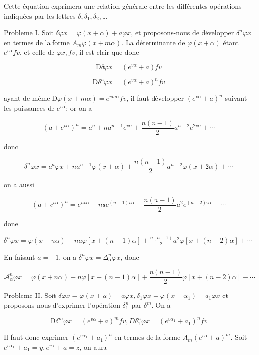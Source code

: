 \documentclass{article}
\begin{document}
Cette équation exprimera une relation générale entre les différentes opérations indiquées par les lettres \(\delta, \delta_{1}, \delta_{2}, \ldots\)

Probleme I. Soit \(\delta \varphi x=\varphi(x+\alpha)+a \varphi x\), et proposons-nous de développer \(\delta^{n} \varphi x\) en termes de la forme \(A_{m} \varphi(x+m \alpha)\). La déterminante de \(\varphi(x+\alpha)\) étant \(e^{v \alpha} f v\), et celle de \(\varphi x, f v\), il est clair que
done

\[
\mathrm{D} \delta \varphi x=\left(e^{v \alpha}+a\right) f v
\]

\[
\mathrm{D} \delta^{n} \varphi x=\left(e^{v \alpha}+a\right)^{n} f v
\]

ayant de même \(\mathrm{D} \varphi(x+m \alpha)=e^{v m \alpha} f v\), il faut développer \(\left(e^{v \alpha}+a\right)^{n}\) suivant les puissances de \(e^{v \alpha}\); or on a

\[
\left(a+e^{v \alpha}\right)^{n}=a^{n}+n a^{n-1} e^{v \alpha}+\frac{n(n-1)}{2} a^{n-2} e^{2 v \alpha}+\cdots
\]

donc

\[
\delta^{n} \varphi x=a^{n} \varphi x+n a^{n-1} \varphi(x+\alpha)+\frac{n(n-1)}{2} a^{n-2} \varphi(x+2 \alpha)+\cdots
\]

on a aussi

\[
\left(a+e^{v \alpha}\right)^{n}=e^{n v \alpha}+n a e^{(n-1) v \alpha}+\frac{n(n-1)}{2} a^{2} e^{(n-2) v \alpha}+\cdots
\]

done

\(\delta^{n} \varphi x=\varphi(x+n \alpha)+n a \varphi[x+(n-1) \alpha]+\frac{n(n-1)}{2} a^{2} \varphi[x+(n-2) \alpha]+\cdots\)

En faisant \(a=-1\), on a \(\delta^{n} \varphi x=\Delta_{\alpha}^{n} \varphi x\), donc

\[
\mathcal{A}_{\alpha}^{n} \varphi x=\varphi(x+n \alpha)-n \varphi[x+(n-1) \alpha]+\frac{n(n-1)}{2} \varphi[x+(n-2) \alpha]-\cdots
\]

Probleme II. Soit \(\delta \varphi x=\varphi(x+\alpha)+a \varphi x, \delta_{1} \varphi x=\varphi\left(x+\alpha_{1}\right)+a_{1} \varphi x\) et proposons-nous d'exprimer l'opération \(\delta_{1}^{n}\) par \(\delta^{m}\). On a

\[
\mathrm{D} \delta^{m} \varphi x=\left(e^{v \alpha}+a\right)^{m} f v, D \delta_{1}^{n} \varphi x=\left(e^{v \alpha_{1}}+a_{1}\right)^{n} f v
\]

Il faut donc exprimer \(\left(e^{v \alpha_{1}}+a_{1}\right)^{n}\) en termes de la forme \(A_{m}\left(e^{v \alpha}+a\right)^{m}\). Soit \(e^{v \alpha_{1}}+a_{1}=y, e^{v \alpha}+a=z\), on aura
\end{document}
